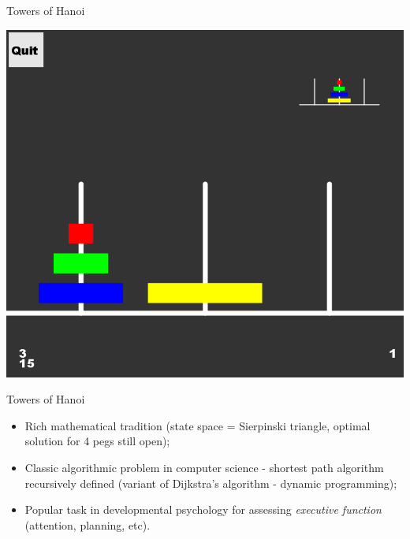 \documentclass[xcolor=table,handout]{beamer}
\begin{document}
\begin{frame}{Towers of Hanoi}
\centerline{
 \includegraphics[height=.9\textheight]{towersofhanoi.png}}
\end{frame}

\begin{frame}{Towers of Hanoi}
  \begin{itemize}
  \item Rich mathematical tradition (state space = \alert{Sierpinski triangle}, optimal solution for 4 pegs still open);
  \item Classic algorithmic problem in computer science - shortest path algorithm recursively defined (variant of \alert{Dijkstra's algorithm} - dynamic programming);
  \item Popular task in \alert{developmental psychology} for assessing \emph{executive function} (attention, planning, etc).
  \end{itemize}
\end{frame}
\end{document}
